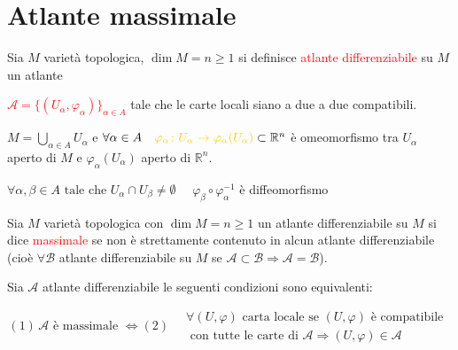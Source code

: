     \section{Atlante massimale}
        \begin{definizione}
        \mbox{}

        Sia $M$ varietà topologica, $\dim M = n \geq 1$ si definisce \textcolor{red}{atlante differenziabile} su $M$ un atlante 

        \textcolor{red}{$\mathcal{A} = \{(U_\alpha, \varphi_\alpha)\}_{\alpha \in A}$} tale che le carte locali siano a due a due compatibili.

        $\displaystyle M = \bigcup_{\alpha \in A} U_\alpha $ e
        $ \forall \alpha \in A \quad \textcolor{amber}{\varphi_\alpha \colon U_\alpha \to \varphi_\alpha(U_\alpha)} \subset \mathbb{R}^n$ \textcolor{amber}{è omeomorfismo}
        tra $U_\alpha$ aperto di $M$ e $\varphi_\alpha(U_\alpha)$ aperto di $\mathbb{R}^n$.

        $\forall \alpha, \beta \in A \text{ tale che } U_\alpha \cap U_\beta \neq \emptyset \quad$ \textcolor{celeste}{$\varphi_\beta \circ \varphi_\alpha^{-1}$} è \textcolor{celeste}{diffeomorfismo}
        \end{definizione}
        \begin{definizione}
        Sia $M$ varietà topologica con $\dim M = n \geq 1$ un atlante differenziabile su $M$ si dice \textcolor{red}{massimale} 
        se non è strettamente contenuto in alcun atlante differenziabile \textcolor{blu}{(cioè $\forall \mathcal{B}$ atlante differenziabile su $M$ se
        $\mathcal{A} \subset \mathcal{B} \Rightarrow \mathcal{A} = \mathcal{B}$)}. 
        \end{definizione}
        \begin{proposizione}
        \label{prop:atlante_massimale_equivalenza}
        \mbox{}

        Sia $\mathcal{A}$ atlante differenziabile le seguenti condizioni sono equivalenti:

        \[ (1) \, \mathcal{A}  \text{ è massimale } \iff (2) \begin{aligned}  \, &\forall (U, \varphi) \text{ carta locale se } (U, \varphi) \text{ è compatibile } \\
             &\text{ con tutte le carte di } \mathcal{A} \Rightarrow (U, \varphi) \in \mathcal{A} \end{aligned} \]
        \end{proposizione}
